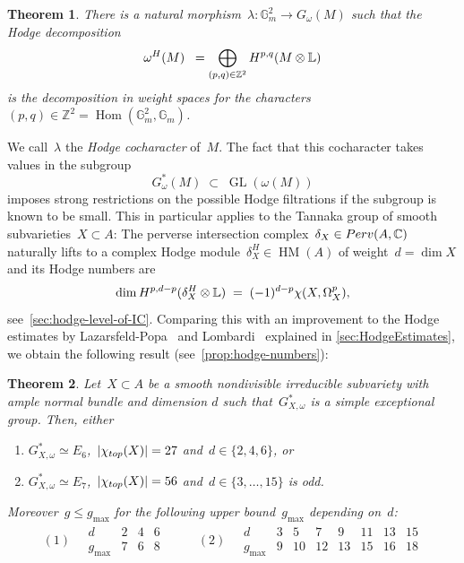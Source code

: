 \documentclass[a4paper]{amsart}
\newcommand{\bbC}{\mathbb{C}}
\newcommand{\bbG}{\mathbb{G}}
\newcommand{\bbL}{\mathbb{L}}
\newcommand{\bbZ}{\mathbb{Z}}
\newcommand{\rH}{\textup{H}}
\renewcommand{\top}{\textup{top}}
\newcommand{\Perv}{\textup{Perv}}
\DeclareMathOperator{\Hom}{Hom}
\DeclareMathOperator{\GL}{GL}
\DeclareMathOperator{\HM}{HM}
\renewcommand{\le}{\leqslant}
\theoremstyle{plain}
\newtheorem{theoremintro}{Theorem}
\theoremstyle{definition}
\numberwithin{equation}{section}
\begin{document}
\begin{theoremintro} 
There is a natural morphism~$\lambda \colon \bbG_m^2 \to G_\omega(M)$ such that the Hodge decomposition
%
\[
 \omega^H(M) \;\;= \bigoplus_{(p,q)\in \bbZ^2} \rH^{p,q}(M\otimes \bbL)
\]
%
is the decomposition in weight spaces for the characters~$(p,q)\in \bbZ^2 = \Hom(\bbG_m^2, \bbG_m)$.
\end{theoremintro} 

We call~$\lambda$ the \emph{Hodge cocharacter} of~$M$. The fact that this cocharacter takes values in the subgroup 
%
\[ G_\omega^\ast(M) \;\subset\; \GL(\omega(M)) \]
%
imposes strong restrictions on the possible Hodge filtrations if the subgroup is known to be small. This in particular applies to the Tannaka group of smooth subvarieties~$X\subset A$: The perverse intersection complex~$\delta_X\in \Perv(A, \bbC)$ naturally lifts to a complex Hodge module~$\delta_X^H\in \HM(A)$ of weight~$d=\dim X$ and its Hodge numbers are 
%
\[
 \dim \rH^{p,d-p}(\delta_X^H \otimes \bbL) \;=\; (-1)^{d-p} \chi(X, \Omega^p_X),
\] 
%
see~\cref{sec:hodge-level-of-IC}. Comparing this with an improvement to the Hodge estimates by Lazarsfeld-Popa~\cite{LazarsfeldPopa} and Lombardi~\cite{Lombardi13} explained in  \cref{sec:HodgeEstimates}, we obtain the following result (see~\cref{prop:hodge-numbers}):

\begin{theoremintro} \label{Thm:hodge-numbers-intro}
Let~$X\subset A$ be a smooth nondivisible irreducible subvariety with ample normal bundle and dimension $d$ such that~$G_{X, \omega}^\ast$ is a simple exceptional group. Then, either\smallskip 
%
\begin{enumerate} 
\item $G_{X,\omega}^\ast \simeq E_6$,~$|\chi_{\top}(X)| = 27$ and~$d\in \{2,4,6\}$, or\smallskip 
\item $G_{X,\omega}^\ast \simeq E_7$,~$|\chi_{\top}(X)| = 56$ and~$d\in \{3,\dots,15\}$ is odd. \smallskip
\end{enumerate} 
%
Moreover~$g\le g_{\max}$ for the following upper bound~$g_{\max}$ depending on~$d$:
%
\begin{align*}
(1) \quad
\begin{array}{c|ccccc}
d & 2 & 4 & 6  \\ \hline
g_{\max} & 7 & 6 & 8 
\end{array}
&&\quad (2) \quad
\begin{array}{c|ccccccc}
d & 3 & 5 & 7 & 9 & 11 & 13 & 15 \\ \hline
g_{\max} & 9 & 10 & 12 & 13 & 15 & 16 & 18
\end{array}
\end{align*}
\end{theoremintro}
\end{document}
